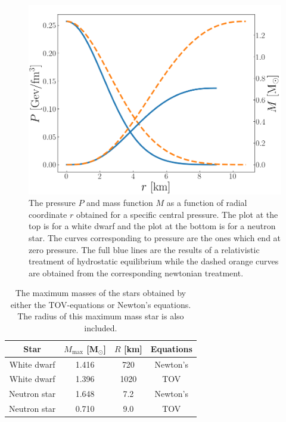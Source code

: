 \documentclass[twocolumn]{article}
\begin{document}
\begin{large}
\begin{figure}[!t]
\begin{center}
        \includegraphics[scale=0.35]{NeutronStar_example.png}
    \end{center}
    \caption{The pressure $P$ and mass function $M$ as a function of radial coordinate $r$ obtained for a specific central pressure. The plot at the top is for a white dwarf and the plot at the bottom is for a neutron star. The curves corresponding to pressure are the ones which end at zero pressure. The full blue lines are the results of a relativistic treatment of hydrostatic equilibrium while the dashed orange curves are obtained from the corresponding newtonian treatment.}
    \label{29maj0007}
\end{figure}
\begin{table}[!b]
\centering
    \begin{tabular}{c c c c}
        Star & $M_\text{max}$ [M$_\odot$] & $R$ [km] & Equations \\ 
        \hline\hline
        White dwarf  & 1.416 & 720  & Newton's \\ 
        White dwarf  & 1.396 & 1020 & TOV \\ 
        Neutron star & 1.648 & 7.2  & Newton's \\ 
        Neutron star & 0.710 & 9.0  & TOV \\ 
    \end{tabular}
    \caption{The maximum masses of the stars obtained by either the TOV-equations or Newton's equations. The radius of this maximum mass star is also included.}
    \label{30maj2217}
\end{table}


\end{large}
\end{document}
